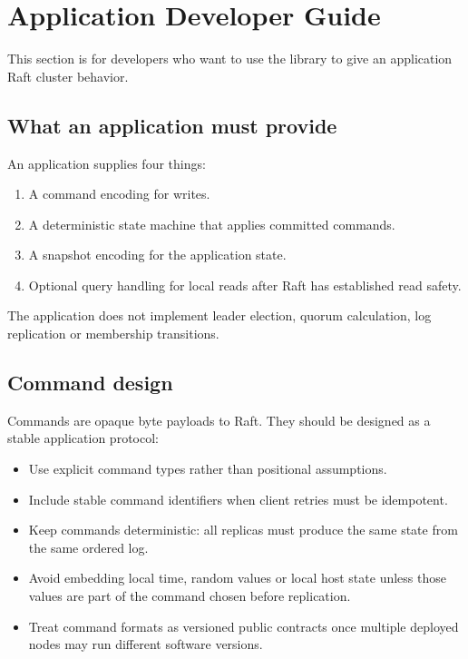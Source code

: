 \section{Application Developer Guide}
\label{sec:ApplicationDeveloper}

This section is for developers who want to use the library to give an
application Raft cluster behavior.

\subsection{What an application must provide}

An application supplies four things:

\begin{enumerate}
\item A command encoding for writes.
\item A deterministic state machine that applies committed commands.
\item A snapshot encoding for the application state.
\item Optional query handling for local reads after Raft has established read safety.
\end{enumerate}

The application does not implement leader election, quorum calculation, log
replication or membership transitions.

\subsection{Command design}

Commands are opaque byte payloads to Raft. They should be designed as a stable
application protocol:

\begin{itemize}
\item Use explicit command types rather than positional assumptions.
\item Include stable command identifiers when client retries must be idempotent.
\item Keep commands deterministic: all replicas must produce the same state from
the same ordered log.
\item Avoid embedding local time, random values or local host state unless those
values are part of the command chosen before replication.
\item Treat command formats as versioned public contracts once multiple deployed
nodes may run different software versions.
\end{itemize}

